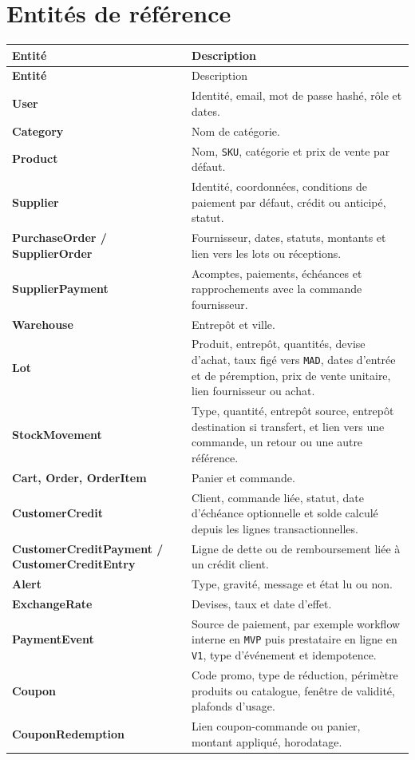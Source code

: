 \documentclass[11pt,a4paper]{scrreprt}
\newcommand{\code}[1]{\texttt{#1}}
\begin{document}
\section{Entités de référence}
\begin{longtable}{>{\bfseries}p{4.4cm}p{9.6cm}}
\toprule
Entité & Description \\
\midrule
\endfirsthead
\toprule
Entité & Description \\
\midrule
\endhead
User & Identité, email, mot de passe hashé, rôle et dates. \\
Category & Nom de catégorie. \\
Product & Nom, \code{SKU}, catégorie et prix de vente par défaut. \\
Supplier & Identité, coordonnées, conditions de paiement par défaut, crédit ou anticipé, statut. \\
PurchaseOrder / SupplierOrder & Fournisseur, dates, statuts, montants et lien vers les lots ou réceptions. \\
SupplierPayment & Acomptes, paiements, échéances et rapprochements avec la commande fournisseur. \\
Warehouse & Entrepôt et ville. \\
Lot & Produit, entrepôt, quantités, devise d'achat, taux figé vers \code{MAD}, dates d'entrée et de péremption, prix de vente unitaire, lien fournisseur ou achat. \\
StockMovement & Type, quantité, entrepôt source, entrepôt destination si transfert, et lien vers une commande, un retour ou une autre référence. \\
Cart, Order, OrderItem & Panier et commande. \\
CustomerCredit & Client, commande liée, statut, date d'échéance optionnelle et solde calculé depuis les lignes transactionnelles. \\
CustomerCreditPayment / CustomerCreditEntry & Ligne de dette ou de remboursement liée à un crédit client. \\
Alert & Type, gravité, message et état lu ou non. \\
ExchangeRate & Devises, taux et date d'effet. \\
PaymentEvent & Source de paiement, par exemple workflow interne en \code{MVP} puis prestataire en ligne en \code{V1}, type d'événement et idempotence. \\
Coupon & Code promo, type de réduction, périmètre produits ou catalogue, fenêtre de validité, plafonds d'usage. \\
CouponRedemption & Lien coupon-commande ou panier, montant appliqué, horodatage. \\

\end{longtable}
\end{document}

